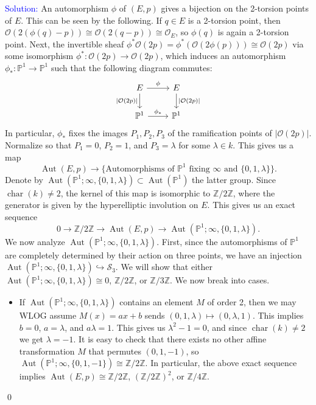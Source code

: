 \documentclass[11pt]{article}
\newcommand{\PP}{\mathbb{P}}
\newcommand{\ZZ}{\mathbb{Z}}
\newcommand{\cO}{\mathcal{O}}
\newcommand{\cS}{\mathcal{S}}
\newcommand{\Char}{\operatorname{char}}
\newcommand{\Aut}{\operatorname{Aut}}
\newenvironment{solution}{\begin{trivlist}\item[]{\textcolor{blue}{Solution:}}}{\qed \end{trivlist}}
\begin{document}
\begin{solution}
	An automorphism $\phi$ of $(E, p)$ gives a bijection on the 2-torsion points of $E$. This can be seen by the following. If $q \in E$ is a 2-torsion point, then $\cO(2(\phi(q) - p)) \cong \cO(2(q - p)) \cong \cO_E$, so $\phi(q)$ is again a 2-torsion point. Next, the invertible sheaf $\phi^* \cO(2p) = \phi^*( \cO(2\phi(p))) \cong \cO(2p)$ via some isomorphism $\phi^*: \cO(2p) \rightarrow \cO(2p)$, which induces an automorphism $\phi_*: \PP^1 \rightarrow \PP^1$ such that the following diagram commutes:
	\[\begin{tikzcd}
		E & E \\
		{\PP^1} & {\PP^1}
		\arrow["\phi", from=1-1, to=1-2]
		\arrow["{|\cO(2p)|}"', from=1-1, to=2-1]
		\arrow["{|\cO(2p)|}", from=1-2, to=2-2]
		\arrow["{\phi_*}", from=2-1, to=2-2]
	\end{tikzcd}\]
	In particular, $\phi_*$ fixes the images $P_1, P_2, P_3$ of the ramification points of $|\cO(2p)|$. Normalize so that $P_1 = 0$, $P_2 = 1$, and $P_3 = \lambda$ for some $\lambda \in k$. This gives us a map 
	\[
		\Aut(E, p) \longrightarrow \{\text{Automorphisms of $\PP^1$ fixing $\infty$ and $\{0, 1, \lambda\}$}\}.
	\]
	Denote by $\Aut(\PP^1; \infty, \{0, 1, \lambda\}) \subset \Aut(\PP^1)$ the latter group.
	Since $\Char(k) \neq 2$, the kernel of this map is isomorphic to $\ZZ/2\ZZ$, where the generator is given by the hyperelliptic involution on $E$. This gives us an exact sequence 
	\[
		0 \longrightarrow \ZZ/2\ZZ \longrightarrow \Aut(E, p) \longrightarrow \Aut(\PP^1; \infty, \{0, 1, \lambda\}).
	\]
	We now analyze $\Aut(\PP^1; \infty, \{0, 1, \lambda\})$. First, since the automorphisms of $\PP^1$ are completely determined by their action on three points, we have an injection $\Aut(\PP^1; \infty, \{0, 1, \lambda\}) \hookrightarrow \cS_3$. We will show that either $\Aut(\PP^1; \infty, \{0, 1, \lambda\}) \cong 0$, $\ZZ/2\ZZ$, or $\ZZ/3\ZZ$. We now break into cases.
	\begin{itemize}
		\item If $\Aut(\PP^1; \infty, \{0, 1, \lambda\})$ contains an element $M$ of order 2, then we may WLOG assume $M(x) = ax + b$ sends $(0, 1, \lambda) \mapsto (0, \lambda, 1)$. This implies $b = 0$, $a = \lambda$, and $a \lambda = 1$. This gives us $\lambda^2 - 1 = 0$, and since $\Char(k) \neq 2$ we get $\lambda = -1$. It is easy to check that there exists no other affine transformation $M$ that permutes $(0, 1, -1)$, so $\Aut(\PP^1; \infty, \{0, 1, -1\}) \cong \ZZ/2\ZZ$. In particular, the above exact sequence implies $\Aut(E, p) \cong \ZZ/2\ZZ$, $(\ZZ/2\ZZ)^2$, or $\ZZ/4\ZZ$. 
		

\end{itemize}
\end{solution}
\end{document}
